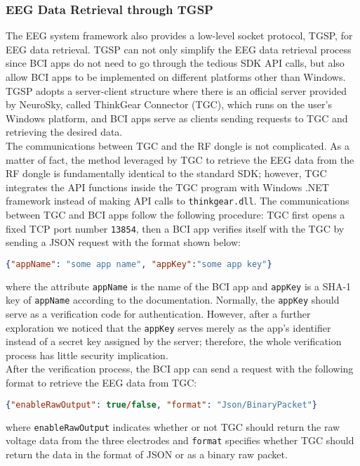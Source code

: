 \subsubsection{EEG Data Retrieval through TGSP}
The EEG system framework also provides a low-level socket protocol, TGSP, for EEG data retrieval. TGSP can not only simplify the EEG data retrieval process since BCI apps do not need to go through the tedious SDK API calls, but also allow BCI apps to be implemented on different platforms other than Windows. TGSP adopts a server-client structure where there is an official server provided by NeuroSky, called ThinkGear Connector (TGC), which runs on the user's Windows platform, and BCI apps serve as clients sending requests to TGC and retrieving the desired data. \\
%
\indent The communications between TGC and the RF dongle is not complicated. As a matter of fact, the method leveraged by TGC to retrieve the EEG data from the RF dongle is fundamentally identical to the standard SDK; however, TGC integrates the API functions inside the TGC program with Windows .NET framework instead of making API calls to \texttt{thinkgear.dll}. The communications between TGC and BCI apps follow the following procedure: TGC first opens a fixed TCP port number \texttt{13854}, then a BCI app verifies itself with the TGC by sending a JSON request with the format shown below:
\begin{lstlisting}[language=json]
{"appName": "some app name", "appKey":"some app key"}
\end{lstlisting}
where the attribute \texttt{appName} is the name of the BCI app and \texttt{appKey} is a SHA-1 key of \texttt{appName} according to the documentation. Normally, the \texttt{appKey} should serve as a verification code for authentication. However, after a further exploration we noticed that the \texttt{appKey} serves merely as the app's identifier instead of a secret key assigned by the server; therefore, the whole verification process has little security implication. \\
%
\indent After the verification process, the BCI app can send a request with the following format to retrieve the EEG data from TGC:
\begin{lstlisting}[language=json]
{"enableRawOutput": true/false, "format": "Json/BinaryPacket"}
\end{lstlisting}
where \texttt{enableRawOutput} indicates whether or not TGC should return the raw voltage data from the three electrodes and \texttt{format} specifies whether TGC should return the data in the format of JSON or as a binary raw packet. \\

